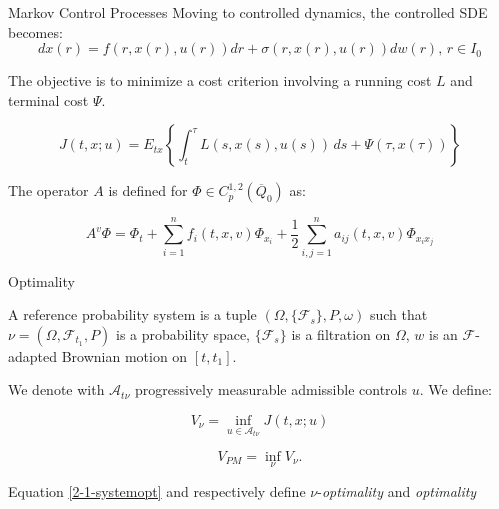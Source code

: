 \documentclass[10pt, compress]{beamer}
\begin{document}
\begin{frame}{Markov Control Processes}
    Moving to controlled dynamics, the controlled SDE becomes:
    \[dx(r) = f(r,x(r),u(r))dr + \sigma(r,x(r),u(r))dw(r),\, r\in I_0\]
    
    The objective is to minimize a cost criterion involving a running cost $L$ and terminal cost $\Psi$.
    
    \[J(t,x;u) = E_{tx}\left\{\int_t^{\tau} L(s,x(s),u(s))\,ds + \Psi(\tau,x(\tau))\right\}\]

    The operator $A$ is defined for $\Phi\in C^{1,2}_p(\overline{Q}_0)$ as:

    \begin{equation}\label{2-1-defAwithv}
    A^{v}\Phi = \Phi_t + \sum_{i=1}^nf_i(t,x,v)\Phi_{x_i} + \frac{1}{2}\sum_{i,j=1}^n a_{ij}(t,x,v)\Phi_{x_ix_j}
    \end{equation}
\end{frame}

\begin{frame}{Optimality}
    \begin{definition}
    A reference probability system is a tuple $(\Omega,\{\mathcal{F}_s\},P,\omega)$ such that $\nu=(\Omega,\mathcal{F}_{t_1},P)$ is a probability space, $\{\mathcal{F}_s\}$ is a filtration on $\Omega$, $w$ is an $\mathcal{F}$-adapted Brownian motion on $[t,t_1]$.

    We denote with $\mathcal{A}_{t\nu}$ progressively measurable admissible controls $u$. We define:

    \begin{equation}\label{2-1-systemopt}
        V_{\nu} = \inf_{u\in\mathcal{A}_{t\nu}} J(t,x;u)
    \end{equation}

    \begin{equation}\label{2-1-oprt}
        V_{PM} = \inf_{\nu} V_{\nu}.
    \end{equation}

    Equation \ref{2-1-systemopt} and \label{2-1-oprt} respectively define $\nu$-\textit{optimality} and \textit{optimality}    \end{definition}
\end{frame}

    
\end{document}
